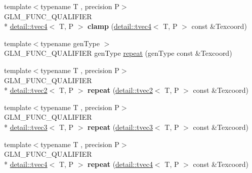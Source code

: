 \begin{DoxyCompactItemize}
\item 
\hypertarget{namespaceglm_a7939dfce34455127dfbd4db97129b19c}{{\footnotesize template$<$typename T , precision P$>$ }\\G\-L\-M\-\_\-\-F\-U\-N\-C\-\_\-\-Q\-U\-A\-L\-I\-F\-I\-E\-R \\*
\hyperlink{structglm_1_1detail_1_1tvec4}{detail\-::tvec4}$<$ T, P $>$ {\bfseries clamp} (\hyperlink{structglm_1_1detail_1_1tvec4}{detail\-::tvec4}$<$ T, P $>$ const \&Texcoord)}\label{namespaceglm_a7939dfce34455127dfbd4db97129b19c}

\item 
{\footnotesize template$<$typename gen\-Type $>$ }\\G\-L\-M\-\_\-\-F\-U\-N\-C\-\_\-\-Q\-U\-A\-L\-I\-F\-I\-E\-R gen\-Type \hyperlink{group__gtx__wrap_ga809650c6310ea7c42666e918c117fb6f}{repeat} (gen\-Type const \&Texcoord)
\item 
\hypertarget{namespaceglm_a7553fe126144d53b6824a71289ecd757}{{\footnotesize template$<$typename T , precision P$>$ }\\G\-L\-M\-\_\-\-F\-U\-N\-C\-\_\-\-Q\-U\-A\-L\-I\-F\-I\-E\-R \\*
\hyperlink{structglm_1_1detail_1_1tvec2}{detail\-::tvec2}$<$ T, P $>$ {\bfseries repeat} (\hyperlink{structglm_1_1detail_1_1tvec2}{detail\-::tvec2}$<$ T, P $>$ const \&Texcoord)}\label{namespaceglm_a7553fe126144d53b6824a71289ecd757}

\item 
\hypertarget{namespaceglm_a93da051ea2cdf0d5d13e1637657e0796}{{\footnotesize template$<$typename T , precision P$>$ }\\G\-L\-M\-\_\-\-F\-U\-N\-C\-\_\-\-Q\-U\-A\-L\-I\-F\-I\-E\-R \\*
\hyperlink{structglm_1_1detail_1_1tvec3}{detail\-::tvec3}$<$ T, P $>$ {\bfseries repeat} (\hyperlink{structglm_1_1detail_1_1tvec3}{detail\-::tvec3}$<$ T, P $>$ const \&Texcoord)}\label{namespaceglm_a93da051ea2cdf0d5d13e1637657e0796}

\item 
\hypertarget{namespaceglm_a1af9904d6f7e983e9138d5ffd0fa0949}{{\footnotesize template$<$typename T , precision P$>$ }\\G\-L\-M\-\_\-\-F\-U\-N\-C\-\_\-\-Q\-U\-A\-L\-I\-F\-I\-E\-R \\*
\hyperlink{structglm_1_1detail_1_1tvec4}{detail\-::tvec4}$<$ T, P $>$ {\bfseries repeat} (\hyperlink{structglm_1_1detail_1_1tvec4}{detail\-::tvec4}$<$ T, P $>$ const \&Texcoord)}\label{namespaceglm_a1af9904d6f7e983e9138d5ffd0fa0949}


\end{DoxyCompactItemize}
